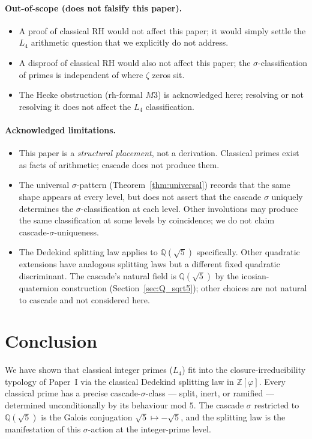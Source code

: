 \documentclass[11pt,a4paper]{article}
\theoremstyle{definition}
\theoremstyle{remark}
\begin{document}
\paragraph{Out-of-scope (does not falsify this paper).}
\begin{itemize}\itemsep0pt
  \item A proof of classical RH would not affect this paper; it would simply settle the $L_4$ arithmetic question that we explicitly do not address.
  \item A disproof of classical RH would also not affect this paper; the $\sigma$-classification of primes is independent of where $\zeta$ zeros sit.
  \item The Hecke obstruction (rh-formal $M3$) is acknowledged here; resolving or not resolving it does not affect the $L_4$ classification.
\end{itemize}

\paragraph{Acknowledged limitations.}
\begin{itemize}\itemsep0pt
  \item This paper is a \emph{structural placement}, not a derivation. Classical primes exist as facts of arithmetic; cascade does not produce them.
  \item The universal $\sigma$-pattern (Theorem~\ref{thm:universal}) records that the same shape appears at every level, but does not assert that the cascade $\sigma$ uniquely determines the $\sigma$-classification at each level. Other involutions may produce the same classification at some levels by coincidence; we do not claim cascade-$\sigma$-uniqueness.
  \item The Dedekind splitting law applies to $\mathbb{Q}(\sqrt{5})$ specifically. Other quadratic extensions have analogous splitting laws but a different fixed quadratic discriminant. The cascade's natural field is $\mathbb{Q}(\sqrt{5})$ by the icosian-quaternion construction (Section~\ref{sec:Q_sqrt5}); other choices are not natural to cascade and not considered here.
\end{itemize}

\section{Conclusion}\label{sec:conclusion}

We have shown that classical integer primes ($L_4$) fit into the
closure-irreducibility typology of Paper~I via the classical Dedekind
splitting law in $\mathbb{Z}[\varphi]$. Every classical prime has a
precise cascade-$\sigma$-class --- split, inert, or ramified ---
determined unconditionally by its behaviour mod $5$. The cascade $\sigma$
restricted to $\mathbb{Q}(\sqrt{5})$ is the Galois conjugation
$\sqrt{5} \mapsto -\sqrt{5}$, and the splitting law is the manifestation
of this $\sigma$-action at the integer-prime level.
\end{document}
